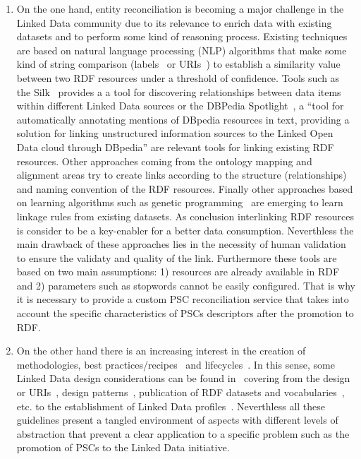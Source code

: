  \begin{enumerate}
  \item  On the one hand, entity reconciliation is becoming a major challenge in the Linked Data community due to its relevance 
 to enrich data with existing datasets and to perform some kind of reasoning process. Existing techniques are based 
 on natural language processing (NLP) algorithms that make some kind of string comparison (labels~\cite{Serimi} or URIs~\cite{Maali_Cyganiak_2011}) 
 to establish a similarity value between two RDF resources under a threshold of confidence. Tools such as the Silk~\cite{DBLP:conf/semweb/JentzschIB10} provides a 
 a tool for discovering relationships between data items within different Linked Data sources or the DBPedia Spotlight~\cite{DBLP:conf/i-semantics/MendesJGB11}, a 
 ``tool for automatically annotating mentions of DBpedia resources in text, providing a solution for linking unstructured information sources to the Linked Open Data 
 cloud through DBpedia'' are relevant tools for linking existing RDF resources. Other approaches coming from the ontology mapping and alignment areas try to create 
 links according to the structure (relationships) and naming convention of the RDF resources. Finally other approaches based on learning algorithms such as 
 genetic programming~\cite{DBLP:conf/semweb/IseleB11} are emerging to learn linkage rules from existing datasets. As conclusion interlinking RDF resources is 
 consider to be a key-enabler for a better data consumption. Neverthless the main drawback of these approaches lies in the necessity of human validation 
 to ensure the validaty and quality of the link. Furthermore these tools are based on two main assumptions: 1) resources are already available in RDF and 
 2) parameters such as stopwords cannot be easily configured. That is why it is necessary to provide a custom PSC reconciliation service that takes into account 
 the specific characteristics of PSCs descriptors after the promotion to RDF.
 
 \item On the other hand there is an increasing interest in the creation of methodologies, best practices/recipes~\cite{best-gld,linked-data-cookbook} and lifecycles~\cite{gld-lifecycle,lod2-stack}. In this sense, some 
 Linked Data design considerations can be found in~\cite{bizer07how} covering from the design or URIs~\cite{Sauermann+2007a,bernerslee1998uri,uris-uk}, design patterns~\cite{linked-data-patterns}, 
 publication of RDF datasets and vocabularies~\cite{Berr08}, etc. to the establishment of Linked Data profiles~\cite{basic-profile-w3c}. Neverthless all these guidelines present 
 a tangled environment of aspects with different levels of abstraction that prevent a clear application to a specific problem such as the promotion of PSCs to the Linked Data initiative.
 

\end{enumerate}
